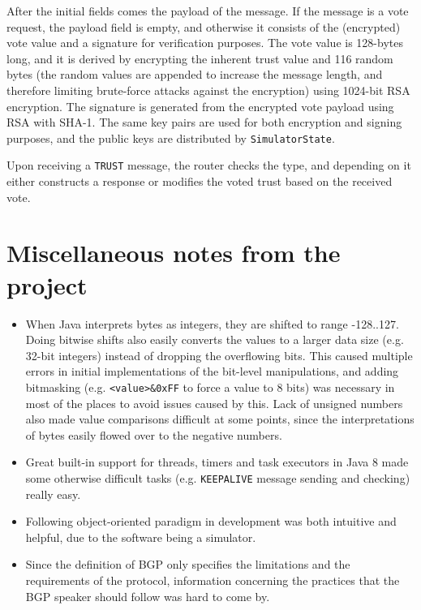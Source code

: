 \documentclass[11pt,a4paper,titlepage]{report}
\begin{document}
After the initial fields comes the payload of the message. If the message is a vote request, the payload field is empty, and otherwise it consists of the (encrypted) vote value and a signature for verification purposes. The vote value is 128-bytes long, and it is derived by encrypting the inherent trust value and 116 random bytes (the random values are appended to increase the message length, and therefore limiting brute-force attacks against the encryption) using 1024-bit RSA encryption. The signature is generated from the encrypted vote payload using RSA with SHA-1. The same key pairs are used for both encryption and signing purposes, and the public keys are distributed by \texttt{SimulatorState}.

Upon receiving a \texttt{TRUST} message, the router checks the type, and depending on it either constructs a response or modifies the voted trust based on the received vote.

\section{Miscellaneous notes from the project}\label{sec:notes}
\begin{itemize}
\item When Java interprets bytes as integers, they are shifted to range -128..127. Doing bitwise shifts also easily converts the values to a larger data size (e.g. 32-bit integers) instead of dropping the overflowing bits. This caused multiple errors in initial implementations of the bit-level manipulations, and adding bitmasking (e.g. \texttt{<value>\&0xFF} to force a value to 8 bits) was necessary in most of the places to avoid issues caused by this. Lack of unsigned numbers also made value comparisons difficult at some points, since the interpretations of bytes easily flowed over to the negative numbers.
\item Great built-in support for threads, timers and task executors in Java 8 made some otherwise difficult tasks (e.g. \texttt{KEEPALIVE} message sending and checking) really easy.
\item Following object-oriented paradigm in development was both intuitive and helpful, due to the software being a simulator.
\item Since the definition of BGP \cite{RFC4271} only specifies the limitations and the requirements of the protocol, information concerning the practices that the BGP speaker should follow was hard to come by.
\end{itemize}



\end{document}
